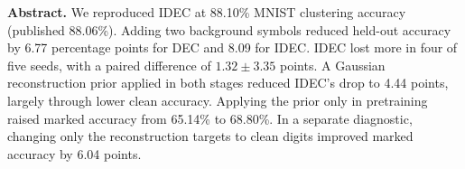 \textbf{Abstract.} We reproduced IDEC at 88.10\% MNIST clustering accuracy (published 88.06\%). Adding two background symbols reduced held-out accuracy by 6.77 percentage points for DEC and 8.09 for IDEC. IDEC lost more in four of five seeds, with a paired difference of $1.32\pm3.35$ points. A Gaussian reconstruction prior applied in both stages reduced IDEC's drop to 4.44 points, largely through lower clean accuracy. Applying the prior only in pretraining raised marked accuracy from 65.14\% to 68.80\%. In a separate diagnostic, changing only the reconstruction targets to clean digits improved marked accuracy by 6.04 points.
